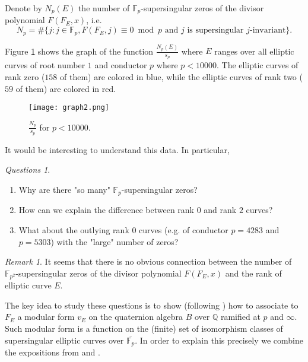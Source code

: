 \documentclass[13pt]{amsart}
\theoremstyle{remark}
\newtheorem*{remark}{Remark}
\newtheorem*{questions}{Questions}
\numberwithin{theorem}{section} \numberwithin{equation}{section}
\begin{document}
Denote by $N_p(E)$ the number of ${\mathbb{F}_p}$-supersingular zeros of the divisor polynomial $F(F_E,x)$, i.e. $$N_p=\#\{j:j \in {\mathbb{F}_p}, F(F_E,j) \equiv 0 \bmod{p}  \textrm{ and $j$ is supersingular $j$-invariant} \}.$$

Figure \ref{fig:1} shows the graph of the function $\frac{N_p(E)}{s_p}$ where $E$ ranges over all elliptic curves of root number $1$ and conductor $p$ where $p<10000$. The elliptic curves of rank zero ($158$ of them) are colored in blue, while the elliptic curves of rank two ($59$ of them) are colored in red.
\begin{figure}[htp]\label{fig:1}
\centering
\texttt{[image: graph2.png]}
\caption{$\frac{N_p}{s_p}$ for $p<10000$.}
\end{figure}

It would be interesting to understand this data. In particular, 
\begin{questions}\
\begin{enumerate}
	\item Why are there "so many" ${\mathbb{F}_p}$-supersingular zeros?
	\item How can we explain the difference between rank $0$ and rank $2$ curves?
	\item What about the outlying rank $0$ curves (e.g. of conductor $p=4283$ and $p=5303$) with the "large" number of zeros?
\end{enumerate}
\end{questions}

\begin{remark}
It seems that there is no obvious connection between the number of $\mathbb{F}_{p^2}$-supersingular zeros of the divisor polynomial $F(F_E,x)$ and the rank of elliptic curve $E$.    
\end{remark}

The key idea to study these questions is to show (following \cite{Serre2}) how to associate to $F_E$ a modular form $v_E$ on the quaternion algebra $B$ over ${\mathbb{Q}}$ ramified at $p$ and $\infty$. Such modular form is a function on the (finite) set of isomorphism classes of supersingular elliptic curves over $\overline{\mathbb{F}_p}$.  In order to explain this precisely we combine the expositions from \cite{Emerton} and \cite{Gross}.
\end{document}
